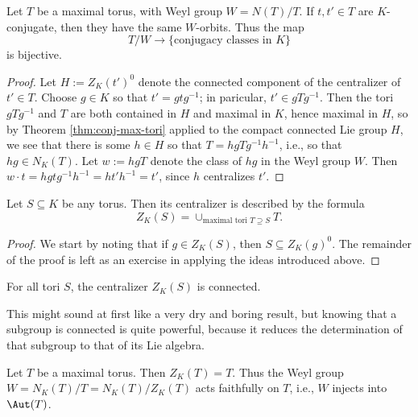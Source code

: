 \documentclass[reqno]{amsart} 
\begin{document}
\begin{theorem}
  Let $T$ be a maximal torus, with Weyl group $W = N(T)/T$.  If $t, t' \in T$ are $K$-conjugate, then they have the same $W$-orbits.  Thus the map
  \begin{equation*}
    T/W \rightarrow \{\text{conjugacy classes in } K\}
  \end{equation*}
  is bijective.
\end{theorem}
\begin{proof}
  Let $H := Z_K(t')^0$ denote the connected component of the centralizer of $t' \in T$.  Choose $g \in K$ so that $t' = g t g^{-1}$; in paricular, $t' \in g T g^{-1}$.  Then the tori $g T g^{-1}$ and $T$ are both contained in $H$ and maximal in $K$, hence maximal in $H$, so by Theorem \ref{thm:conj-max-tori} applied to the compact connected Lie group $H$, we see that there is some $h \in H$ so that $T = h g T g^{-1} h^{-1}$, i.e., so that $h g \in N_K(T)$.  Let $w := h g T$ denote the class of $h g$ in the Weyl group $W$.  Then $w \cdot t = h g t g^{-1} h^{-1} = h t' h^{-1} = t'$, since $h$ centralizes $t'$.
\end{proof}

\begin{theorem}
  Let $S \subseteq K$ be any torus.  Then its centralizer is described by the formula
  \begin{equation*}
    Z_K(S) = \cup _{\text{maximal tori } T \supseteq S} T.
  \end{equation*}
\end{theorem}
\begin{proof}
  We start by noting that if $g \in Z_K(S)$, then $S \subseteq Z_K(g)^0$.  The remainder of the proof is left as an exercise in applying the ideas introduced above.
\end{proof}

\begin{corollary}
  For all tori $S$, the centralizer $Z_K(S)$ is connected.
\end{corollary}
This might sound at first like a very dry and boring result, but knowing that a subgroup is connected is quite powerful, because it reduces the determination of that subgroup to that of its Lie algebra.

\begin{corollary}
  Let $T$ be a maximal torus.  Then $Z_K(T) = T$.  Thus the Weyl group $W = N_K(T)/T = N_K(T)/ Z_K(T)$ acts faithfully on $T$, i.e., $W$ injects into $\Aut(T)$.
\end{corollary}
\end{document}
